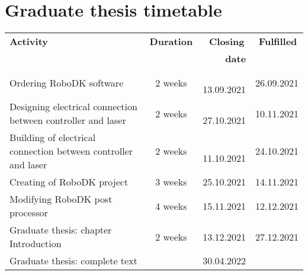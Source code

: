 ﻿\chapter{Graduate thesis timetable \label{ch:ApendPLAN}}


\begin{center}
\begin{tabular}{|p{8cm}|c|r|r|}
  \hline
  \textbf{\hspace{3.3cm} Activity} & \textbf{Duration} & \textbf{Closing\,} & \textbf{Fulfilled\,} \\
  {} & \textbf{} & \textbf{date} & {} \\
  \hline

  {Ordering RoboDK software}
                & {2 weeks} & \,{13.09.2021} & {26.09.2021} \\\hline
  {Designing electrical connection between controller and laser}
                & {2 weeks} & \,{27.10.2021} & {10.11.2021} \\\hline
  {Building of electrical connection between controller and laser}
                & {2 weeks} & \,{11.10.2021} & {24.10.2021} \\\hline
  {Creating of RoboDK project}
                & {3 weeks} & {25.10.2021} & {14.11.2021} \\\hline
  {Modifying RoboDK post processor}
                & {4 weeks} & {15.11.2021} & {12.12.2021} \\\hline
  {Graduate thesis: chapter Introduction}
                & {2 weeks} & {13.12.2021} & {27.12.2021} \\\hline
  {Graduate thesis: complete text}
                & {} & {30.04.2022} & {} \\\hline
\end{tabular}
\end{center}






